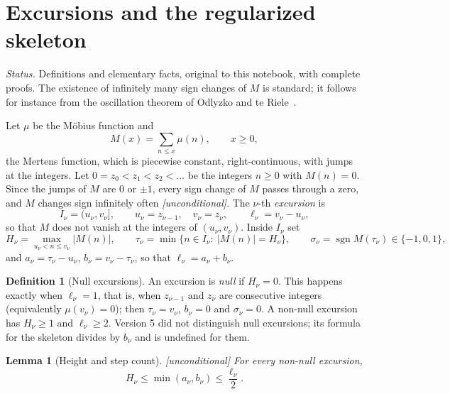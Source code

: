 \documentclass[11pt]{amsart}
\numberwithin{equation}{section}
\theoremstyle{plain}
\newtheorem{lemma}[theorem]{Lemma}
\theoremstyle{definition}
\newtheorem{definition}[theorem]{Definition}
\theoremstyle{remark}
\DeclareMathOperator{\sgn}{sgn}
\begin{document}
\section{Excursions and the regularized skeleton}
\label{sec:definitions}

\noindent\emph{Status.} Definitions and elementary facts, original to this
notebook, with complete proofs. The existence of infinitely many sign changes
of $M$ is standard; it follows for instance from the oscillation theorem of
Odlyzko and te Riele~\cite{OdlyzkoTeRiele1985}.

\medskip

Let $\mu$ be the Möbius function and
\begin{equation}
\label{eq:mertens_def}
  M(x)=\sum_{n\le x}\mu(n),\qquad x\ge 0,
\end{equation}
the Mertens function, which is piecewise constant, right-continuous, with
jumps at the integers. Let $0=z_0<z_1<z_2<\dots$ be the integers $n\ge0$ with
$M(n)=0$. Since the jumps of $M$ are $0$ or $\pm1$, every sign change of $M$
passes through a zero, and $M$ changes sign infinitely often
\emph{[unconditional]}. The $\nu$-th \emph{excursion} is
\begin{equation}
\label{eq:excursion_def}
  I_\nu=(u_\nu,v_\nu],\qquad u_\nu=z_{\nu-1},\quad v_\nu=z_\nu,
  \qquad \ell_\nu=v_\nu-u_\nu ,
\end{equation}
so that $M$ does not vanish at the integers of $(u_\nu,v_\nu)$. Inside
$I_\nu$ set
\begin{equation}
\label{eq:peak_def}
  H_\nu=\max_{u_\nu<n\le v_\nu}|M(n)|,\qquad
  \tau_\nu=\min\{n\in I_\nu:\ |M(n)|=H_\nu\},\qquad
  \sigma_\nu=\sgn M(\tau_\nu)\in\{-1,0,1\},
\end{equation}
and $a_\nu=\tau_\nu-u_\nu$, $b_\nu=v_\nu-\tau_\nu$, so that
$\ell_\nu=a_\nu+b_\nu$.

\begin{definition}[Null excursions]
\label{def:null}
An excursion is \emph{null} if $H_\nu=0$. This happens exactly when
$\ell_\nu=1$, that is, when $z_{\nu-1}$ and $z_\nu$ are consecutive integers
(equivalently $\mu(v_\nu)=0$); then $\tau_\nu=v_\nu$, $b_\nu=0$ and
$\sigma_\nu=0$. A non-null excursion has $H_\nu\ge1$ and $\ell_\nu\ge2$.
Version 5 did not distinguish null excursions; its formula for the skeleton
divides by $b_\nu$ and is undefined for them.
\end{definition}

\begin{lemma}[Height and step count]
\label{lem:height_steps}
\emph{[unconditional]} For every non-null excursion,
\begin{equation}
\label{eq:height_steps}
  H_\nu\le\min(a_\nu,b_\nu)\le \frac{\ell_\nu}{2}.
\end{equation}
\end{lemma}
\end{document}
